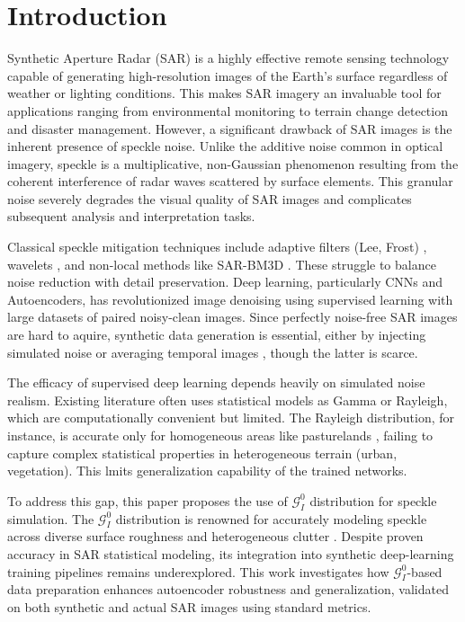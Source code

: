 \section{Introduction}
\label{sec:introduction}

Synthetic Aperture Radar (SAR) is a highly effective remote sensing technology capable of generating high-resolution
images of the Earth's surface regardless of weather or lighting conditions. This makes SAR imagery an invaluable
tool for applications ranging from environmental monitoring to terrain change detection and disaster management.
However, a significant drawback of SAR images is the inherent presence of speckle noise. Unlike the additive noise
common in optical imagery, speckle is a multiplicative, non-Gaussian phenomenon resulting from the coherent
interference of radar waves scattered by surface elements. This granular noise severely degrades the visual quality
of SAR images and complicates subsequent analysis and interpretation tasks.

Classical speckle mitigation techniques include adaptive filters (Lee, Frost) \parencite{lee1980digital, frost1982model}, wavelets \parencite{zhang2017nonmodel}, and non-local methods like SAR-BM3D \parencite{parrilli2012nonlocal}. These struggle to balance noise reduction with detail preservation. Deep learning, particularly CNNs and Autoencoders, has revolutionized image denoising \parencite{zhang2018dilated,lattari2019deep,vitale2021multiobjective,cardona2025optimization} using supervised learning with large datasets of paired noisy-clean images. Since perfectly noise-free SAR images are hard to aquire, synthetic data generation is essential, either by injecting simulated noise or averaging temporal images \parencite{vasquez2024labeled}, though the latter is scarce.

The efficacy of supervised deep learning depends heavily on simulated noise realism. Existing literature often uses statistical models as Gamma or  Rayleigh, which are computationally convenient but limited. The Rayleigh distribution, for instance, is accurate only for homogeneous areas like pasturelands \parencite{lattari2019deep}, failing to capture complex statistical properties in heterogeneous terrain (urban, vegetation). This lmits generalization capability of the trained networks.

To address this gap, this paper proposes the use of $\mathcal{G}_I^0$ distribution for speckle simulation. The $\mathcal{G}_I^0$ distribution is renowned for accurately modeling speckle across diverse surface roughness and heterogeneous clutter \parencite{originalGI0}. Despite proven accuracy in SAR statistical modeling, its integration into synthetic deep-learning training pipelines remains underexplored. This work investigates how $\mathcal{G}_I^0$-based data preparation enhances autoencoder robustness and generalization, validated on both synthetic and actual SAR images using standard metrics.

